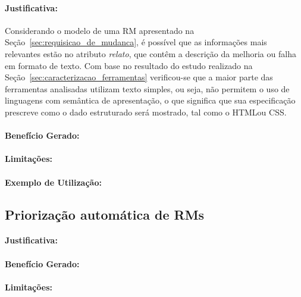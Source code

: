 \paragraph{Justificativa:}
\label{par:justificativa_s06}

Considerando o modelo de uma RM apresentado na
Seção~\ref{sec:requisicao_de_mudanca}, é possível que as informações mais
relevantes estão no atributo \textit{relato}, que contêm a descrição da melhoria
ou falha em formato de texto. Com base no resultado do estudo realizado na
Seção~\ref{sec:caracterizacao_ferramentas} verificou-se que a maior parte das
ferramentas analisadas utilizam texto simples, ou seja, não permitem o uso de
linguagens com semântica de apresentação, o que significa que sua especificação
prescreve como o dado estruturado será mostrado, tal como o HTML\@  ou CSS\@.

\paragraph{Benefício Gerado:}
\label{par:papéis_afetados_s06}

\paragraph{Limitações:}
\label{par:limitacoes_s06}

\paragraph{Exemplo de Utilização:}
\label{par:exemplo_de_utilização_s06}

\subsection{Priorização automática de RMs}
\label{sub:priorizacao_automatica_rms}


\paragraph{Justificativa:}
\label{par:justificativa_s07}

\paragraph{Benefício Gerado:}
\label{par:papéis_afetados_s07}

\paragraph{Limitações:}
\label{par:limitacoes_s07}

